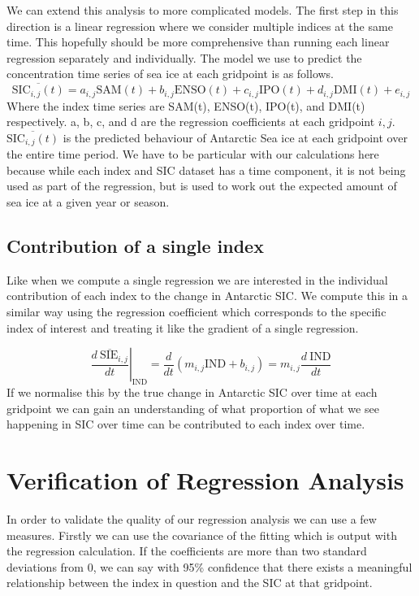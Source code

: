 \documentclass[../main.tex]{subfiles}
\begin{document}
We can extend this analysis to more complicated models. The first step in this direction is a linear regression where we consider multiple indices at the same time. This hopefully should be more comprehensive than running each linear regression separately and individually. The model we use to predict the concentration time series of sea ice at each gridpoint is as follows.
$$
\overline{\text{SIC}_{i,j}\left(t\right)} = a_{i,j} \text{SAM}\left(t\right) + b_{i,j} \text{ENSO}\left(t\right) + c_{i,j} \text{IPO}\left(t\right)+ d_{i,j} \text{DMI}\left(t\right) + e_{i,j}
$$
Where the index time series are SAM(t), ENSO(t), IPO(t), and DMI(t) respectively. a, b, c, and d are the regression coefficients at each gridpoint $i, j$. $\overline{\text{SIC}_{i,j}\left(t\right)}$ is the predicted behaviour of Antarctic Sea ice at each gridpoint over the entire time period. We have to be particular with our calculations here because while each index and SIC dataset has a time component, it is not being used as part of the regression, but is used to work out the expected amount of sea ice at a given year or season.

\subsection{Contribution of a single index}
Like when we compute a single regression we are interested in the individual contribution of each index to the change in Antarctic SIC. We compute this in a similar way using the regression coefficient which corresponds to the specific index of interest and treating it like the gradient of a single regression.

$$
\left. \overline{\frac{d\  \text{SIE}_{i,j}}{dt}}\right|_{\text{IND}} = \frac{d}{dt} \left(m_{i,j}  \text{IND} + b_{i,j}\right) = m_{i,j}  \frac{d\ \text{IND}}{dt}
$$
 If we normalise this by the true change in Antarctic SIC over time at each gridpoint we can gain an understanding of what proportion of what we see happening in SIC over time can be contributed to each index over time.
 
\section{Verification of Regression Analysis}

In order to validate the quality of our regression analysis we can use a few measures. Firstly we can use the covariance of the fitting which is output with the regression calculation. If the coefficients are more than two standard deviations from 0, we can say with 95\% confidence that there exists a meaningful relationship between the index in question and the SIC at that gridpoint. 
\end{document}
